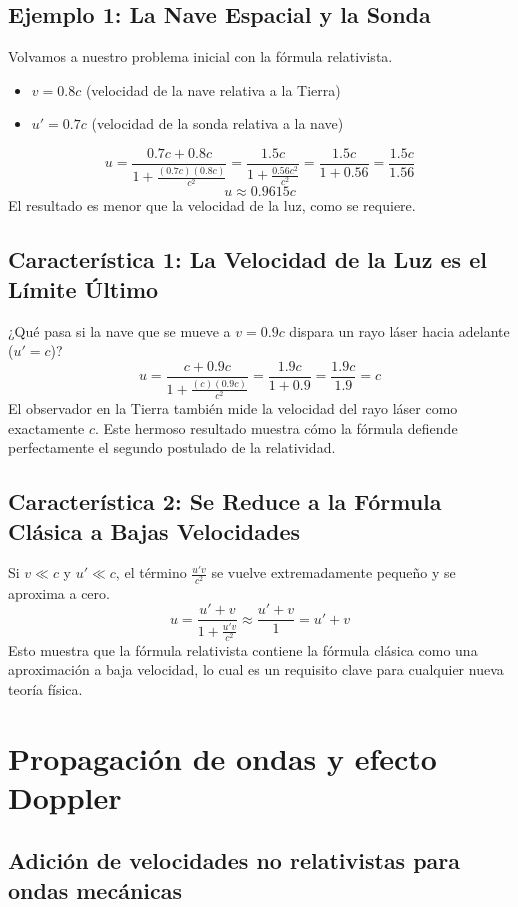 \documentclass[11pt,a4paper]{book}
\begin{document}
\subsection*{Ejemplo 1: La Nave Espacial y la Sonda}
Volvamos a nuestro problema inicial con la fórmula relativista.
\begin{itemize}
    \item $v = 0.8c$ (velocidad de la nave relativa a la Tierra)
    \item $u' = 0.7c$ (velocidad de la sonda relativa a la nave)
\end{itemize}
\[ u = \frac{0.7c + 0.8c}{1 + \frac{(0.7c)(0.8c)}{c^2}} = \frac{1.5c}{1 + \frac{0.56c^2}{c^2}} = \frac{1.5c}{1 + 0.56} = \frac{1.5c}{1.56} \]
\[ u \approx 0.9615c \]
El resultado es menor que la velocidad de la luz, como se requiere.

\subsection*{Característica 1: La Velocidad de la Luz es el Límite Último}
¿Qué pasa si la nave que se mueve a $v=0.9c$ dispara un rayo láser hacia adelante ($u'=c$)?
\[ u = \frac{c + 0.9c}{1 + \frac{(c)(0.9c)}{c^2}} = \frac{1.9c}{1 + 0.9} = \frac{1.9c}{1.9} = c \]
El observador en la Tierra también mide la velocidad del rayo láser como exactamente $c$. Este hermoso resultado muestra cómo la fórmula defiende perfectamente el segundo postulado de la relatividad. 

\subsection*{Característica 2: Se Reduce a la Fórmula Clásica a Bajas Velocidades}
Si $v \ll c$ y $u' \ll c$, el término $\frac{u'v}{c^2}$ se vuelve extremadamente pequeño y se aproxima a cero.
\[ u = \frac{u' + v}{1 + \frac{u'v}{c^2}} \approx \frac{u' + v}{1} = u' + v \]
Esto muestra que la fórmula relativista contiene la fórmula clásica como una aproximación a baja velocidad, lo cual es un requisito clave para cualquier nueva teoría física.

\section{Propagación de ondas y efecto Doppler}



\subsection{Adición de velocidades no relativistas para ondas mecánicas}
\end{document}
